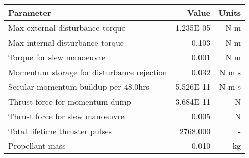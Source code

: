 \begin{tabular}{lrr}
\toprule
                                  Parameter &      Value &  Units \\
\midrule
            Max external disturbance torque &  1.235E-05 &    N m \\
            Max internal disturbance torque &      0.103 &    N m \\
                  Torque for slew manoeuvre &      0.001 &    N m \\
 Momentum storage for disturbance rejection &      0.032 &  N m s \\
       Secular momentum buildup per 48.0hrs &  5.526E-11 &  N m s \\
             Thrust force for momentum dump &  3.684E-11 &      N \\
            Thrust force for slew manoeuvre &      0.005 &      N \\
             Total lifetime thruster pulses &   2768.000 &      - \\
                            Propellant mass &      0.010 &     kg \\
\bottomrule
\end{tabular}
